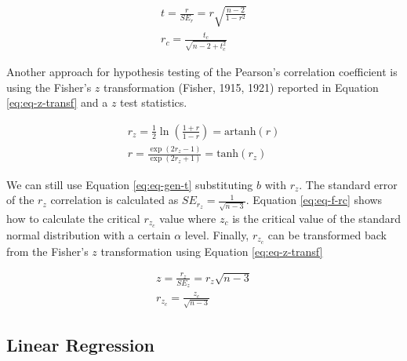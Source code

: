 \documentclass[
  man]{apa7}
\begin{document}
\begin{equation}
\label{eq:eq-rc}
    \begin{gathered}
        t = \frac{r}{SE_r} = r \sqrt{\frac{n - 2}{1 - r^2}} \\
        r_c = \frac{t_c}{\sqrt{n - 2 + t_c^2}}
    \end{gathered}
\end{equation}

Another approach for hypothesis testing of the Pearson's correlation coefficient is using the Fisher's \(z\) transformation (Fisher, 1915, 1921) reported in Equation \eqref{eq:eq-z-transf} and a \(z\) test statistics.

\begin{equation}
    \label{eq:eq-z-transf}
    \begin{gathered}
    r_z = \frac{1}{2} \ln \left(\frac{1 + r}{1 - r} \right) =                   \text{artanh}(r) \\
    r = \frac{\exp(2r_z - 1)}{\exp(2r_z + 1)} = \text{tanh}(r_z)
    \end{gathered}
\end{equation}

We can still use Equation \eqref{eq:eq-gen-t} substituting \(b\) with \(r_z\). The standard error of the \(r_z\) correlation is calculated as \(SE_{r_z} = \frac{1}{\sqrt{n - 3}}\). Equation \eqref{eq:eq-f-rc} shows how to calculate the critical \(r_{z_c}\) value where \(z_c\) is the critical value of the standard normal distribution with a certain \(\alpha\) level. Finally, \(r_{z_c}\) can be transformed back from the Fisher's \(z\) transformation using Equation \eqref{eq:eq-z-transf}

\begin{equation}
    \label{eq:eq-f-rc}
    \begin{gathered}
        z = \frac{r_z}{SE_z} = r_z \sqrt{n - 3} \\
        r_{z_c} = \frac{z_c}{\sqrt{n - 3}}
    \end{gathered}
\end{equation}

\hypertarget{linear-regression}{%
\subsection{Linear Regression}\label{linear-regression}}
\end{document}
